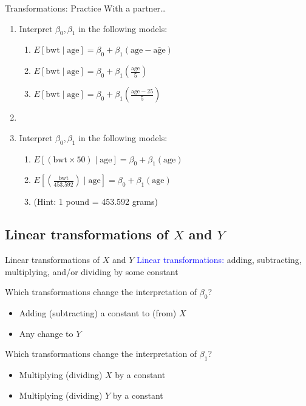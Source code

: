 \documentclass[10pt,t]{beamer}
\begin{document}
\begin{frame}{Transformations: Practice}
With a partner\dots

\vspace{0.3cm}

\begin{enumerate}
	\item Interpret $\beta_0, \beta_1$ in the following models:
	\begin{enumerate}
		\item $E[\text{bwt} \mid \text{age}] = \beta_0 + \beta_1 (\text{age} - \bar{\text{age}})$
		\item $E[\text{bwt} \mid \text{age}] = \beta_0 + \beta_1 \left( \frac{\text{age}}{5} \right)$
		\item $E[\text{bwt} \mid \text{age}] = \beta_0 + \beta_1 \left( \frac{\text{age} - 25}{5} \right)$
	\end{enumerate}
\item[]
	\item Interpret $\beta_0, \beta_1$ in the following models:
	\begin{enumerate}
		\item $E[(\text{bwt} \times 50) \mid \text{age}] = \beta_0 + \beta_1 (\text{age})$
		\item $E[(\frac{\text{bwt}}{453.592}) \mid \text{age}] = \beta_0 + \beta_1 (\text{age})$
		\item[] \tiny (Hint: 1 pound = 453.592 grams)
	\end{enumerate}
\end{enumerate}


\end{frame}

\subsection{Linear transformations of $X$ and $Y$}

\begin{frame}{Linear transformations of $X$ and $Y$}
\textcolor{blue}{Linear transformations:} adding, subtracting, multiplying, and/or dividing by some constant

\vspace{0.3cm}

Which transformations change the interpretation of $\beta_0$? \pause
\begin{itemize}
	\item[] Adding (subtracting) a constant to (from) $X$
	\item[] Any change to $Y$ 
\end{itemize} \pause

\vspace{0.3cm}

Which transformations change the interpretation of $\beta_1$? \pause
\begin{itemize}
	\item[] Multiplying (dividing) $X$ by a constant
	\item[] Multiplying (dividing) $Y$ by a constant 
\end{itemize}
\end{frame}
\end{document}
